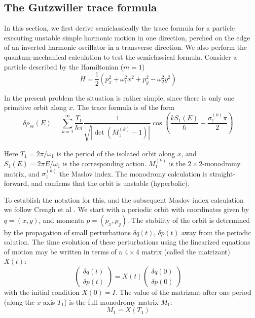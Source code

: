 \documentclass[11pt]{article}
\theoremstyle{plain}
\begin{document}
\subsection{The Gutzwiller trace formula}

In this section, we first derive semiclassically the trace formula for a particle executing unstable simple harmonic motion in one direction, perched on the edge of an inverted harmonic oscillator in a transverse direction. We also perform the quantum-mechanical calculation to test the semiclassical formula. Consider a particle described by the Hamiltonian ($m = 1$)
\begin{equation}
H = \frac{1}{2}(p_x^2 + \omega_1^2 x^2 + p_y^2 - \omega_2^2 y^2)
\label{eq:hamiltonian}
\end{equation}

In the present problem the situation is rather simple, since there is only one primitive orbit along $x$. The trace formula is of the form
\begin{equation}
\delta\rho_{sc}(E) = \sum_{k=1}^{\infty} \frac{T_1}{\hbar\pi} \frac{1}{\sqrt{|\det(M_1^{(k)}-1)|}} \cos\left(\frac{kS_1(E)}{\hbar} - \frac{\sigma_1^{(k)}\pi}{2}\right)
\label{eq:gutzwiller_formula}
\end{equation}

Here $T_1 = 2\pi/\omega_1$ is the period of the isolated orbit along $x$, and $S_1(E) = 2\pi E/\omega_1$ is the corresponding action. $M_1^{(k)}$ is the $2 \times 2$-monodromy matrix, and $\sigma_1^{(k)}$ the Maslov index. The monodromy calculation is straight-forward, and confirms that the orbit is unstable (hyperbolic).

To establish the notation for this, and the subsequent Maslov index calculation we follow Creagh et al \cite{creagh1990}. We start with a periodic orbit with coordinates given by $q = (x,y)$, and momenta $p = (p_x,p_y)$. The stability of the orbit is determined by the propagation of small perturbations $\delta q(t)$, $\delta p(t)$ away from the periodic solution. The time evolution of these perturbations using the linearized equations of motion may be written in terms of a $4 \times 4$ matrix (called the matrizant) $X(t)$:
\begin{equation}
\begin{pmatrix}
\delta q(t) \\
\delta p(t)
\end{pmatrix} = X(t) \begin{pmatrix}
\delta q(0) \\
\delta p(0)
\end{pmatrix}
\label{eq:matrizant}
\end{equation}
with the initial condition $X(0) = I$. The value of the matrizant after one period (along the $x$-axis $T_1$) is the full monodromy matrix $M_1$:
\begin{equation}
M_1 = X(T_1)
\label{eq:full_monodromy}
\end{equation}
\end{document}
